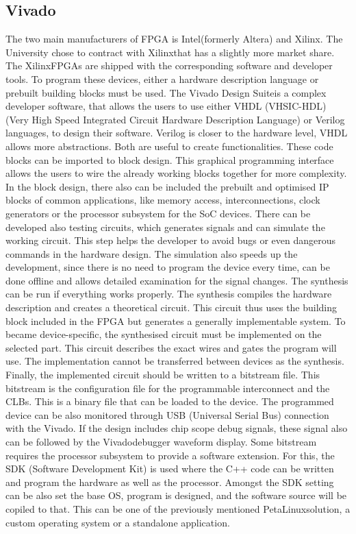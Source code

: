 \subsection{Vivado} %
The two main manufacturers of FPGA is Intel\texttrademark (formerly Altera) and Xilinx\texttrademark.
The University chose to contract with Xilinx\texttrademark that has a slightly more market share.
The Xilinx\texttrademark FPGAs are shipped with the corresponding software and developer tools.
To program these devices, either a hardware description language or prebuilt building blocks must be used.
The Vivado Design Suite\texttrademark is a complex developer software, that allows the users to use either VHDL (VHSIC-HDL) (Very High Speed Integrated Circuit Hardware Description Language) or Verilog languages, to design their software.
Verilog is closer to the hardware level, VHDL allows more abstractions.
Both are useful to create functionalities.
These code blocks can be imported to block design.
This graphical programming interface allows the users to wire the already working blocks together for more complexity.
In the block design, there also can be included the prebuilt and optimised IP blocks of common applications, like memory access, interconnections, clock generators or the processor subsystem for the SoC devices.
There can be developed also testing circuits, which generates signals and can simulate the working circuit.
This step helps the developer to avoid bugs or even dangerous commands in the hardware design.
The simulation also speeds up the development, since there is no need to program the device every time, can be done offline and allows detailed examination for the signal changes.
The synthesis can be run if everything works properly.
The synthesis compiles the hardware description and creates a theoretical circuit.
This circuit thus uses the building block included in the FPGA but generates a generally implementable system.
To became device-specific, the synthesised circuit must be implemented on the selected part.
This circuit describes the exact wires and gates the program will use.
The implementation cannot be transferred between devices as the synthesis.
Finally, the implemented circuit should be written to a bitstream file.
This bitstream is the configuration file for the programmable interconnect and the CLBs.
This is a binary file that can be loaded to the device.
The programmed device can be also monitored through USB (Universal Serial Bus) connection with the Vivado\texttrademark.
If the design includes chip scope debug signals, these signal also can be followed by the Vivado\texttrademark debugger waveform display.
Some bitstream requires the processor subsystem to provide a software extension.
For this, the SDK (Software Development Kit) is used where the C++ code can be written and program the hardware as well as the processor.
Amongst the SDK setting can be also set the base OS, program is designed, and the software source will be copiled to that. 
This can be one of the previously mentioned PetaLinux\texttrademark solution, a custom operating system or a standalone application.

